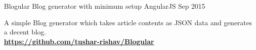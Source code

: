 \begin{cventries}
{\begin{cvitems}
{        }
      \end{cvitems}
    }
  \cventry
    {Blogular}
    {Blog generator with minimum setup}
    {AngularJS}
    {Sep 2015}
    {
      \begin{cvitems}
        \item {A simple Blog generator which takes article contents as JSON data and generates a decent blog. \\
\textbf{\href{https://github.com/tushar-rishav/Blogular}{https://github.com/tushar-rishav/Blogular}}
        }
      \end{cvitems}
    }
\end{cventries}


